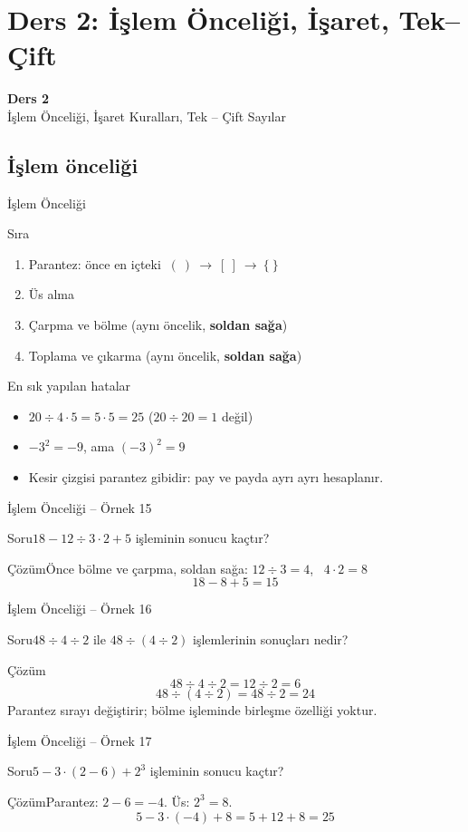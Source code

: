 \documentclass[aspectratio=169,11pt,handout]{beamer}
\newcommand{\soru}[3]{%
\begin{frame}{#1}
  \begin{block}{Soru}\large #2\end{block}
  \pause
  \begin{exampleblock}{Çözüm}\large #3\end{exampleblock}
\end{frame}}
\begin{document}
\section{Ders 2: İşlem Önceliği, İşaret, Tek--Çift}
\begin{frame}
\centering\Large\color{anamavi}\textbf{Ders 2}\\[6pt]\normalsize İşlem Önceliği, İşaret Kuralları, Tek -- Çift Sayılar
\end{frame}

\subsection{İşlem önceliği}
\begin{frame}{İşlem Önceliği}
\begin{block}{Sıra}
\begin{enumerate}
\item Parantez: önce en içteki \(\ (\ )\ \rightarrow\ [\ ]\ \rightarrow\ \{\ \}\)
\item Üs alma
\item Çarpma ve bölme \quad (aynı öncelik, \textbf{soldan sağa})
\item Toplama ve çıkarma \quad (aynı öncelik, \textbf{soldan sağa})
\end{enumerate}
\end{block}
\begin{alertblock}{En sık yapılan hatalar}
\begin{itemize}
\item \(20\div 4\cdot 5=5\cdot 5=25\) \quad (\(20\div 20=1\) değil)
\item \(-3^2=-9\), \quad ama \quad \((-3)^2=9\)
\item Kesir çizgisi parantez gibidir: pay ve payda ayrı ayrı hesaplanır.
\end{itemize}
\end{alertblock}
\end{frame}

\soru{İşlem Önceliği -- Örnek 15}
{\(18-12\div 3\cdot 2+5\) işleminin sonucu kaçtır?}
{Önce bölme ve çarpma, soldan sağa: \(12\div 3=4\), \ \(4\cdot 2=8\)
\[18-8+5=15\]}

\soru{İşlem Önceliği -- Örnek 16}
{\(48\div 4\div 2\) ile \(48\div(4\div 2)\) işlemlerinin sonuçları nedir?}
{\[48\div 4\div 2=12\div 2=6\]
\[48\div(4\div 2)=48\div 2=24\]
Parantez sırayı değiştirir; bölme işleminde birleşme özelliği yoktur.}

\soru{İşlem Önceliği -- Örnek 17}
{\(5-3\cdot(2-6)+2^3\) işleminin sonucu kaçtır?}
{Parantez: \(2-6=-4\). \quad Üs: \(2^3=8\).
\[5-3\cdot(-4)+8=5+12+8=25\]}
\end{document}
